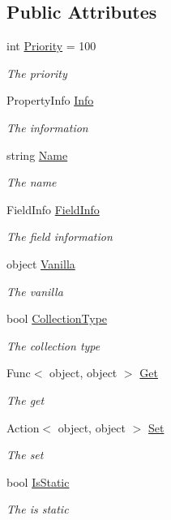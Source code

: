 \subsection*{Public Attributes}
\begin{DoxyCompactItemize}
\item 
int \hyperlink{class_serialization_1_1_get_set_acf288dfe024317153b0dffcfff8e9037}{Priority} = 100
\begin{DoxyCompactList}\small\item\em The priority \end{DoxyCompactList}\item 
Property\+Info \hyperlink{class_serialization_1_1_get_set_a9b7e80c6837875e9417311b3c03f19ae}{Info}
\begin{DoxyCompactList}\small\item\em The information \end{DoxyCompactList}\item 
string \hyperlink{class_serialization_1_1_get_set_a02de1f60b640df55a90afb20b283cd7b}{Name}
\begin{DoxyCompactList}\small\item\em The name \end{DoxyCompactList}\item 
Field\+Info \hyperlink{class_serialization_1_1_get_set_a1023fc00dbf0857c5a41dbad0b791a8c}{Field\+Info}
\begin{DoxyCompactList}\small\item\em The field information \end{DoxyCompactList}\item 
object \hyperlink{class_serialization_1_1_get_set_af3dfec3ec5796d5989c3ede3a43b062d}{Vanilla}
\begin{DoxyCompactList}\small\item\em The vanilla \end{DoxyCompactList}\item 
bool \hyperlink{class_serialization_1_1_get_set_ab18350c7fa05f210d1ca9906914792b9}{Collection\+Type}
\begin{DoxyCompactList}\small\item\em The collection type \end{DoxyCompactList}\item 
Func$<$ object, object $>$ \hyperlink{class_serialization_1_1_get_set_aa0dc6c3a35eb728d92bad5de6de63f23}{Get}
\begin{DoxyCompactList}\small\item\em The get \end{DoxyCompactList}\item 
Action$<$ object, object $>$ \hyperlink{class_serialization_1_1_get_set_a964589b641d283db76e283b447790ef3}{Set}
\begin{DoxyCompactList}\small\item\em The set \end{DoxyCompactList}\item 
bool \hyperlink{class_serialization_1_1_get_set_a55142e0807428a03ba49a0446b01151a}{Is\+Static}
\begin{DoxyCompactList}\small\item\em The is static \end{DoxyCompactList}\end{DoxyCompactItemize}

